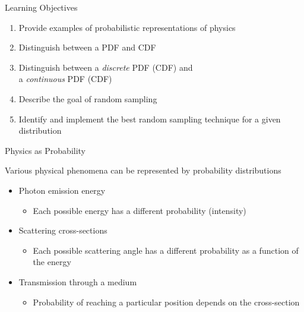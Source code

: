 \documentclass[xcolor=x11names,compress]{beamer}
\renewcommand{\(}{\begin{columns}}
\renewcommand{\)}{\end{columns}}
\newcommand{\<}[1]{\begin{column}{#1}}
\renewcommand{\>}{\end{column}}
\begin{document}
\begin{frame}{Learning Objectives}

    \begin{enumerate}
    \item Provide examples of probabilistic
representations of physics
    \item Distinguish between a PDF and CDF
    \item Distinguish between a \textit{discrete} PDF
(CDF) and \\ a \textit{continuous} PDF (CDF)
    \item Describe the goal of random sampling
    \item Identify and implement the best
random sampling technique for a given
distribution
    \end{enumerate}

\end{frame}


\begin{frame}{Physics as Probability}

Various physical phenomena can be
represented by probability distributions

\begin{itemize}
  \item Photon emission energy
    \begin{itemize}
    \item Each possible energy has a different probability
(intensity)
    \end{itemize} 
    \pause
    \vspace*{0.5 em}
  \item Scattering cross-sections
    \begin{itemize}
    \item Each possible scattering angle has a different
probability as a function of the energy
    \end{itemize}
    \pause
    \vspace*{0.5 em}
  \item Transmission through a medium
    \begin{itemize}
    \item Probability of reaching a particular position
depends on the cross-section
    \end{itemize}
\end{itemize}
\end{frame}
\end{document}
